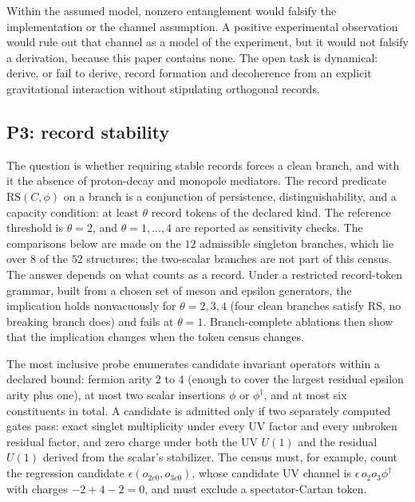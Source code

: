 Within the assumed model, nonzero entanglement would falsify the implementation or the channel assumption. A positive
experimental observation would rule out that channel as a model of the experiment, but it would not falsify a
derivation, because this paper contains none. The open task is dynamical: derive, or fail to derive, record formation
and decoherence from an explicit gravitational interaction without stipulating orthogonal records.

\subsection{P3: record stability}\label{record-stability-open-program}

The question is whether requiring stable records forces a clean branch, and with it the absence of proton-decay and
monopole mediators. The record predicate \(\mathrm{RS}(C,\phi)\) on a branch is a conjunction of persistence,
distinguishability, and a capacity condition: at least \(\theta\) record tokens of the declared kind. The reference
threshold is \(\theta=2\), and \(\theta=1,\dots,4\) are reported as sensitivity checks. The comparisons below are made
on the \(12\) admissible singleton branches, which lie over \(8\) of the \(52\) structures; the two-scalar branches are not
part of this census. The answer depends on what counts as a record. Under a restricted record-token grammar, built
from a chosen set of meson and epsilon generators, the implication holds nonvacuously for \(\theta=2,3,4\) (four clean
branches satisfy \(\mathrm{RS}\), no breaking branch does) and fails at \(\theta=1\). Branch-complete ablations then
show that the implication changes when the token census changes.

The most inclusive probe enumerates candidate invariant operators within a declared bound: fermion arity \(2\) to \(4\)
(enough to cover the largest residual epsilon arity plus one), at most two scalar insertions \(\phi\) or
\(\phi^\dagger\), and at most six constituents in total. A candidate is admitted only if two separately computed gates
pass: exact singlet multiplicity under every UV factor and every unbroken residual factor, and zero charge under both
the UV \(U(1)\) and the residual \(U(1)\) derived from the scalar's stabilizer. The census must, for example, count the
regression candidate \(\epsilon(o_{2c0},o_{3c0})\), whose candidate UV channel is \(\epsilon\,o_2o_3\phi^\dagger\) with
charges \(-2+4-2=0\), and must exclude a spectator-Cartan token.


